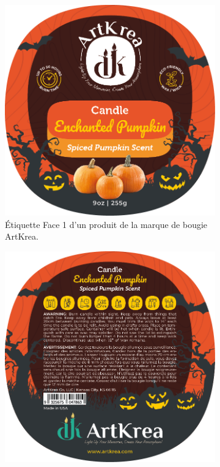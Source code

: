 \documentclass[11pt,fleqn,onecolumn,oneside]{book}
\begin{document}
\begin{figure}[htbp]
    \centering
    \begin{subfigure}[b]{0.45\textwidth} %
        \includegraphics[width=\textwidth]{Pictures/images/chapitre7/sticker.png}
        \caption{Étiquette Face 1 d'un produit de la marque de bougie ArtKrea.}
        \label{fig:sticker1}
    \end{subfigure}
    \hfill %
    \begin{subfigure}[b]{0.45\textwidth} %
        \includegraphics[width=\textwidth]{Pictures/images/chapitre7/sticker-verso.png}

\end{subfigure}
\end{figure}
\end{document}
